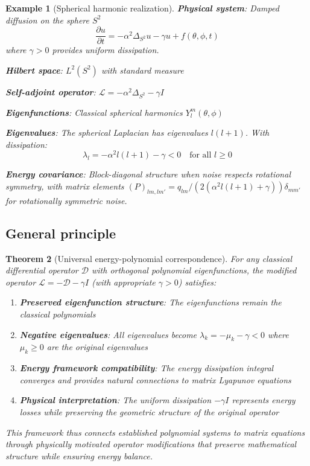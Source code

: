 \documentclass[a4paper,12pt]{article}
\newtheorem{theorem}{Theorem}[section]
\newtheorem{example}[theorem]{Example}
\begin{document}
\begin{example}[Spherical harmonic realization]\label{ex:spherical}
\textbf{Physical system}: Damped diffusion on the sphere $S^2$
\begin{equation}
\frac{\partial u}{\partial t} = -\alpha^2\Delta_{S^2} u - \gamma u + f(\theta,\phi,t)
\end{equation}
where $\gamma > 0$ provides uniform dissipation.

\textbf{Hilbert space}: $L^2(S^2)$ with standard measure

\textbf{Self-adjoint operator}: $\mathcal{L} = -\alpha^2\Delta_{S^2} - \gamma I$

\textbf{Eigenfunctions}: Classical spherical harmonics $Y_l^m(\theta,\phi)$

\textbf{Eigenvalues}: The spherical Laplacian has eigenvalues $l(l+1)$. With dissipation:
\begin{equation}
\lambda_l = -\alpha^2 l(l+1) - \gamma < 0 \quad \text{for all } l \geq 0
\end{equation}

\textbf{Energy covariance}: Block-diagonal structure when noise respects rotational symmetry, with matrix elements $(P)_{lm,lm'} = q_{lm}/(2(\alpha^2 l(l+1) + \gamma)) \delta_{mm'}$ for rotationally symmetric noise.
\end{example}

\subsection{General principle}

\begin{theorem}[Universal energy-polynomial correspondence]\label{thm:universal}
For any classical differential operator $\mathcal{D}$ with orthogonal polynomial eigenfunctions, the modified operator $\mathcal{L} = -\mathcal{D} - \gamma I$ (with appropriate $\gamma > 0$) satisfies:
\begin{enumerate}
\item \textbf{Preserved eigenfunction structure}: The eigenfunctions remain the classical polynomials
\item \textbf{Negative eigenvalues}: All eigenvalues become $\lambda_k = -\mu_k - \gamma < 0$ where $\mu_k \geq 0$ are the original eigenvalues
\item \textbf{Energy framework compatibility}: The energy dissipation integral converges and provides natural connections to matrix Lyapunov equations
\item \textbf{Physical interpretation}: The uniform dissipation $-\gamma I$ represents energy losses while preserving the geometric structure of the original operator
\end{enumerate}

This framework thus connects established polynomial systems to matrix equations through physically motivated operator modifications that preserve mathematical structure while ensuring energy balance.
\end{theorem}
\end{document}
